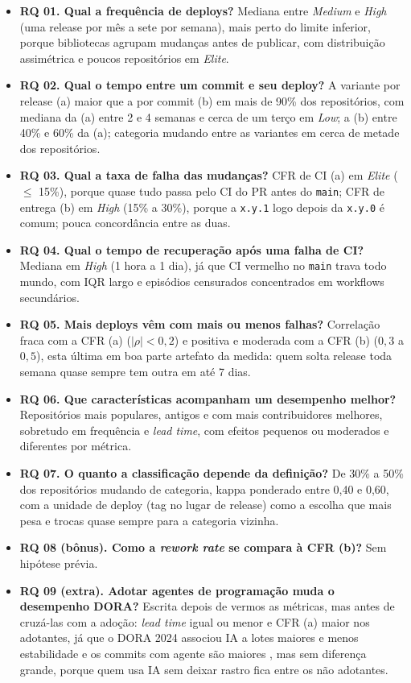 \documentclass[12pt]{article}
\begin{document}
\begin{itemize}
\item \textbf{RQ 01. Qual a frequência de deploys?} Mediana entre \textit{Medium} e \textit{High}
(uma release por mês a sete por semana), mais perto do limite inferior, porque bibliotecas agrupam
mudanças antes de publicar, com distribuição assimétrica e poucos repositórios em \textit{Elite}.
\item \textbf{RQ 02. Qual o tempo entre um commit e seu deploy?} A variante por release (a) maior
que a por commit (b) em mais de 90\% dos repositórios, com mediana da (a) entre 2 e 4 semanas e cerca
de um terço em \textit{Low}; a (b) entre 40\% e 60\% da (a); categoria mudando entre as variantes em
cerca de metade dos repositórios.
\item \textbf{RQ 03. Qual a taxa de falha das mudanças?} CFR de CI (a) em \textit{Elite}
($\leq$ 15\%), porque quase tudo passa pelo CI do PR antes do \texttt{main}; CFR de entrega (b) em
\textit{High} (15\% a 30\%), porque a \texttt{x.y.1} logo depois da \texttt{x.y.0} é comum; pouca
concordância entre as duas.
\item \textbf{RQ 04. Qual o tempo de recuperação após uma falha de CI?} Mediana em \textit{High}
(1 hora a 1 dia), já que CI vermelho no \texttt{main} trava todo mundo, com IQR largo e episódios
censurados concentrados em workflows secundários.
\item \textbf{RQ 05. Mais deploys vêm com mais ou menos falhas?} Correlação fraca com a CFR (a)
($|\rho| < 0{,}2$) e positiva e moderada com a CFR (b) ($0{,}3$ a $0{,}5$), esta última em boa
parte artefato da medida: quem solta release toda semana quase sempre tem outra em até 7 dias.
\item \textbf{RQ 06. Que características acompanham um desempenho melhor?} Repositórios mais
populares, antigos e com mais contribuidores melhores, sobretudo em frequência e \textit{lead time},
com efeitos pequenos ou moderados e diferentes por métrica.
\item \textbf{RQ 07. O quanto a classificação depende da definição?} De 30\% a 50\% dos
repositórios mudando de categoria, kappa ponderado entre 0,40 e 0,60, com a unidade de deploy (tag
no lugar de release) como a escolha que mais pesa e trocas quase sempre para a categoria vizinha.
\item \textbf{RQ 08 (bônus). Como a \textit{rework rate} se compara à CFR (b)?} Sem hipótese prévia.
\item \textbf{RQ 09 (extra). Adotar agentes de programação muda o desempenho DORA?} Escrita depois
de vermos as métricas, mas antes de cruzá-las com a adoção: \textit{lead time} igual ou menor e CFR
(a) maior nos adotantes, já que o DORA 2024 associou IA a lotes maiores e menos estabilidade
\cite{dora2024} e os commits com agente são maiores \cite{robbes2026agentic}, mas sem diferença grande,
porque quem usa IA sem deixar rastro fica entre os não adotantes.
\end{itemize}
\end{document}
